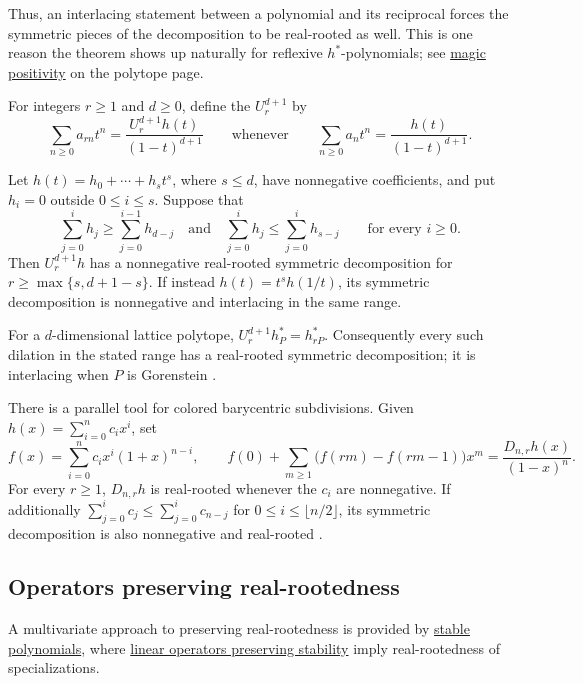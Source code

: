 Thus, an interlacing statement between a polynomial and its reciprocal
forces the symmetric pieces of the decomposition to be real-rooted as well.
This is one reason the theorem shows up naturally for reflexive
$h^*$-polynomials; see \hyperref[magicPositiveEhrhart]{magic positivity} on
the polytope page.

For integers $r\geq1$ and $d\geq0$, define the
\label{veroneseNumeratorOperator}
$U_r^{d+1}$ by
\[
 \sum_{n\geq0}a_{rn}t^n
 =\frac{U_r^{d+1}h(t)}{(1-t)^{d+1}}
 \qquad\text{whenever}\qquad
 \sum_{n\geq0}a_nt^n=\frac{h(t)}{(1-t)^{d+1}}.
\]

\begin{theorem}
\label{jochemkoVeroneseSymmetricDecomposition}
Let $h(t)=h_0+\dotsb+h_st^s$, where $s\leq d$, have nonnegative
coefficients, and put $h_i=0$ outside $0\leq i\leq s$.  Suppose that
\[
 \sum_{j=0}^i h_j\geq\sum_{j=0}^{i-1}h_{d-j}
 \quad\text{and}\quad
 \sum_{j=0}^i h_j\leq\sum_{j=0}^i h_{s-j}
 \qquad\text{for every }i\geq0.
\]
Then $U_r^{d+1}h$ has a nonnegative real-rooted symmetric decomposition for
$r\geq\max\{s,d+1-s\}$.  If instead $h(t)=t^sh(1/t)$, its symmetric
decomposition is nonnegative and interlacing in the same range.
\end{theorem}
For a $d$-dimensional lattice polytope, $U_r^{d+1}h_P^*=h_{rP}^*$.
Consequently every such dilation in the stated range has a real-rooted
symmetric decomposition; it is interlacing when $P$ is Gorenstein
\cite[Cor.~6.1--6.2]{Jochemko2022SymmetricDecompositions}.

There is a parallel tool for colored barycentric subdivisions.  Given
$h(x)=\sum_{i=0}^n c_ix^i$, set
\[
 f(x)=\sum_{i=0}^n c_ix^i(1+x)^{n-i},
 \qquad
 f(0)+\sum_{m\geq1}\bigl(f(rm)-f(rm-1)\bigr)x^m
 =\frac{D_{n,r}h(x)}{(1-x)^n}.
\]
For every $r\geq1$, $D_{n,r}h$ is real-rooted whenever the $c_i$ are
nonnegative.  If additionally
$\sum_{j=0}^i c_j\leq\sum_{j=0}^i c_{n-j}$ for
$0\leq i\leq\lfloor n/2\rfloor$, its symmetric decomposition is also
nonnegative and real-rooted
\cite[Thm.~1.3]{AthanasiadisTzanaki2021}.



\subsection[realRootedPreservers]{Operators preserving real-rootedness}

A multivariate approach to preserving real-rootedness is provided by
\hyperref[stablePolynomial]{stable polynomials},
where \hyperref[stabilityOperators]{linear operators preserving stability}
imply real-rootedness of specializations.

